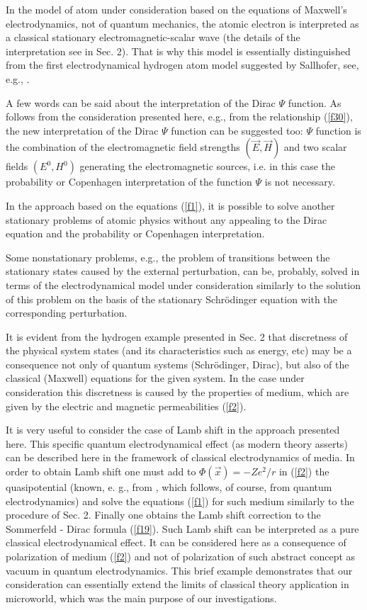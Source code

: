 \documentclass[a4paper,12pt]{article}
\begin{document}
In the model of atom under consideration based on the equations of Maxwell's
electrodynamics, not of quantum mechanics, the atomic electron is
interpreted as a classical stationary electromagnetic-scalar wave (the
details of the interpretation see in Sec. 2). That is why this model is
essentially distinguished from the first electrodynamical hydrogen atom
model suggested by Sallhofer, see, e.g., \cite{SALL,LAK}.

A few words can be said about the interpretation of the Dirac $\Psi $
function. As follows from the consideration presented here, e.g., from the
relationship (\ref{f30}), the new interpretation of the Dirac $\Psi $
function can be suggested too: $\Psi $ function is the combination of the
electromagnetic field strengths $\left( \overrightarrow{E},\overrightarrow{H}%
\right) $ and two scalar fields $\left( E^0,H^0\right) $ generating the
electromagnetic sources, i.e. in this case the probability or Copenhagen
interpretation of the function $\Psi $ is not necessary.

In the approach based on the equations (\ref{f1}), it is possible to solve
another stationary problems of atomic physics without any appealing to the
Dirac equation and the probability or Copenhagen interpretation.

Some nonstationary problems, e.g., the problem of transitions between the
stationary states caused by the external perturbation, can be, probably,
solved in terms of the electrodynamical model under consideration similarly
to the solution of this problem on the basis of the stationary Schr\"odinger
equation with the corresponding perturbation.

It is evident from the hydrogen example presented in Sec. 2 that discretness
of the physical system states (and its characteristics such as energy, etc)
may be a consequence not only of quantum systems (Schr\"odinger, Dirac), but
also of the classical (Maxwell) equations for the given system. In the case
under consideration this discretness is caused by the properties of medium,
which are given by the electric and magnetic permeabilities (\ref{f2}).

It is very useful to consider the case of Lamb shift in the approach
presented here. This specific quantum electrodynamical effect (as modern
theory asserts) can be described here in the framework of classical
electrodynamics of media. In order to obtain Lamb shift one must add to $%
\Phi \left( \overrightarrow{x}\right) =-Ze^2/r$ in (\ref{f2}) the
quasipotential (known, e. g., from \cite{HAL}, which follows, of course,
from quantum electrodynamics) and solve the equations (\ref{f1}) for such
medium similarly to the procedure of Sec. 2. Finally one obtains the Lamb
shift correction to the Sommerfeld - Dirac formula (\ref{f19}). Such Lamb
shift can be interpreted as a pure classical electrodynamical effect. It can
be considered here as a consequence of polarization of medium (\ref{f2}) and
not of polarization of such abstract concept as vacuum in quantum
electrodynamics. This brief example demonstrates that our consideration can
essentially extend the limits of classical theory application in microworld,
which was the main purpose of our investigations.
\end{document}
